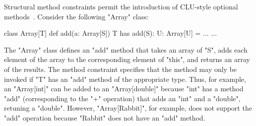 
Structural method constraints permit the introduction of
CLU-style optional methods~\cite{clu}.  Consider the following
\xcd"Array" class:
{\footnotesize
\begin{xten}
class Array[T] {
  def add(a: Array[S])
    {T has add(S): U}: Array[U] = { ... }
  ...
}
\end{xten}}

\noindent
The \xcd"Array" class defines an \xcd"add" method that takes 
an array of \xcd"S", adds each element of the array to the
corresponding element of \xcd"this", and returns an array of the
results.  The method constraint specifies that the method may
only be invoked if \xcd"T" has an \xcd"add" method of the
appropriate type.  Thus, for example, an \xcd"Array[int]"
can be added to an \xcd"Array[double]" because \xcd"int"
has a method \xcd"add" (corresponding to the \xcd"+" operation)
that adds an \xcd"int" and a \xcd"double", retuning a
\xcd"double".  However, \xcd"Array[Rabbit]", for example, does not support
the \xcd"add" operation because \xcd"Rabbit" does not have an
\xcd"add" method.

